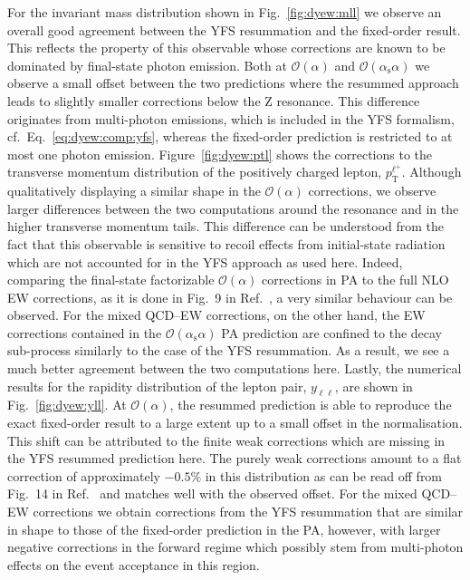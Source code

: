 \documentclass[11pt]{cernrep}
\newcommand{\order}{\ensuremath{\mathcal{O}}}
\newcommand{\alphas}{\ensuremath{\alpha_\mathrm{s}}}
\newcommand{\rT}{\ensuremath{\mathrm{T}}} %
\DeclareRobustCommand{\PZ}{{\ensuremath{\mathrm{Z}}}}
\DeclareRobustCommand{\Pl}{{\ensuremath{\ell}}}
\DeclareRobustCommand{\Plp}{{\ensuremath{\ell^+}}}
\begin{document}
For the invariant mass distribution shown in Fig.~\ref{fig:dyew:mll} we 
observe an overall good agreement between the YFS resummation and 
the fixed-order result. This reflects the property of this observable 
whose corrections are known to be dominated by final-state photon 
emission. Both at $\order(\alpha)$ and $\order(\alphas\alpha)$ we 
observe a small offset between the two predictions where the resummed 
approach leads to slightly smaller corrections below the $\PZ$ 
resonance. This difference originates from multi-photon emissions, 
which is included in the YFS formalism, cf.\ Eq.~\eqref{eq:dyew:comp:yfs}, 
whereas the fixed-order prediction is restricted to at most one 
photon emission.
Figure~\ref{fig:dyew:ptl} shows the corrections to the transverse momentum 
distribution of the positively charged lepton, $p_\rT^\Plp$. Although 
qualitatively displaying a similar shape in the $\order(\alpha)$ corrections, 
we observe larger differences between the two computations around the 
resonance and in the higher transverse momentum tails. This difference 
can be understood from the fact that this observable is sensitive to 
recoil effects from initial-state radiation which are not accounted for 
in the YFS approach as used here.  Indeed, comparing the final-state 
factorizable $\order(\alpha)$ corrections in PA to the full NLO EW 
corrections, as it is done in Fig.~9 in Ref.~\cite{Dittmaier:2014qza},
a very similar behaviour can be observed.
For the mixed QCD--EW corrections, on 
the other hand, the EW corrections contained in the 
$\order(\alphas\alpha)$ PA prediction are confined to the decay 
sub-process similarly to the case of the YFS resummation. As a result, 
we see a much better agreement between the two computations here.
Lastly, the numerical results for the rapidity distribution of the 
lepton pair, $y_{\Pl\Pl}$, are shown in Fig.~\ref{fig:dyew:yll}. At 
$\order(\alpha)$, the resummed prediction is able to reproduce the 
exact fixed-order result to a large extent up to a small offset in 
the normalisation. This shift can be attributed to the finite weak 
corrections which are missing in the YFS resummed prediction here. 
The purely weak corrections amount to a flat correction of 
approximately $-0.5\%$ in this distribution as can be read off from
Fig.~14 in Ref.~\cite{Dittmaier:2009cr} and matches well with 
the observed offset. For the mixed QCD--EW corrections we obtain 
corrections from the YFS resummation that are similar in shape to 
those of the fixed-order prediction in the PA, however, with larger 
negative corrections in the forward regime which possibly stem from 
multi-photon effects on the event acceptance in this region.
\end{document}

